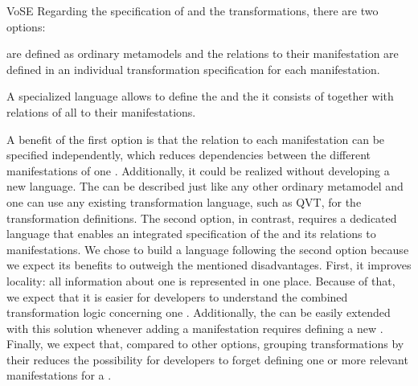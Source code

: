 \begin{copiedFrom}{VoSE}
Regarding the specification of \conceptmetamodels and the transformations, there are two options:
\begin{description}[leftmargin=\parindent]
    \item[External concept definition:] \Conceptmetamodels are defined as ordinary metamodels and the relations to their manifestation are defined in an individual transformation specification %
    for each manifestation. %
    \item[Internal concept definition:] A specialized language allows to define the \conceptmetamodel and the \commonalities it consists of together with relations of all \commonalities to their manifestations. %
\end{description}

A benefit of the first option is that the relation to each manifestation can be specified independently, which reduces dependencies between the different manifestations of one \conceptmetamodel.
Additionally, it could be realized without developing a new language. The \conceptmetamodels can be described just like any other ordinary metamodel and one can use any existing transformation language, such as QVT, for the transformation definitions.
The second option, in contrast, requires a dedicated language that enables an integrated specification of the \conceptmetamodel and its relations to manifestations.
We chose to build a language following the second option because we expect its benefits to outweigh the mentioned disadvantages.
First, it improves locality: all information about one \commonality is represented in one place.
Because of that, we expect that it is easier for developers to understand the combined transformation logic concerning one \commonality.
Additionally, the \conceptmetamodel can be easily extended with this solution whenever adding a manifestation requires defining a new \commonality.
Finally, we expect that, compared to other options, grouping transformations by their \commonality reduces the possibility for developers to forget defining one or more relevant manifestations for a \commonality.



\end{copiedFrom}
